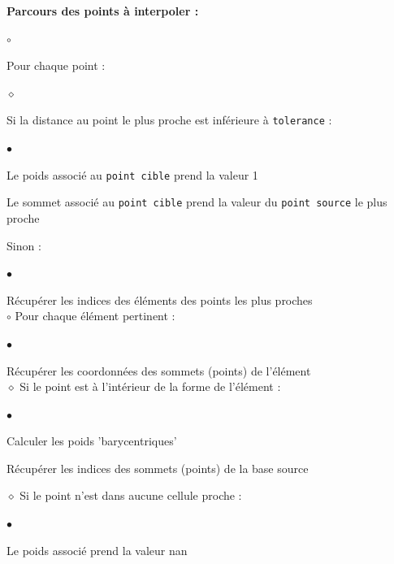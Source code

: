 \textbf{Parcours des points à interpoler :}
\begin{list}{$\circ$}{\leftmargin=0.5cm  \itemsep=0cm}
    \item Pour chaque point :
    \begin{list}{$\diamond$}{\leftmargin=0.5cm  \itemsep=0cm}
        \item Si la distance au point le plus proche est inférieure à \texttt{tolerance} :
        \begin{list}{$\bullet$}{\leftmargin=0.5cm \itemsep=0cm}
            \item Le poids associé au \texttt{point cible} prend la valeur 1
            \item Le sommet associé au \texttt{point cible} prend la valeur du \texttt{point source} le plus proche
        \end{list}
        \item Sinon :
        \begin{list}{$\bullet$}{\leftmargin=0.5cm  \itemsep=0cm}
            \item Récupérer les indices des éléments des points les plus proches\\
            $\circ$ Pour chaque élément pertinent :
            \begin{list}{$\bullet$}{\leftmargin=0.5cm \itemsep=0cm}
                \item Récupérer les coordonnées des sommets (points) de l'élément\\
                $\diamond$ Si le point est à l'intérieur de la forme de l'élément :
                \begin{list}{$\bullet$}{\leftmargin=0.5cm  \itemsep=0cm}
                    \item Calculer les poids 'barycentriques'
                    \item Récupérer les indices des sommets (points) de la base source
                \end{list}
            \end{list}
        \end{list}
    \end{list}
    $\diamond$ Si le point n'est dans aucune cellule proche :
    \begin{list}{$\bullet$}{\leftmargin=0.5cm  \itemsep=0cm}
        \item Le poids associé prend la valeur nan
    \end{list}
\end{list}

